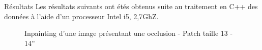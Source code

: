 \documentclass[final,hyperref={pdfpagelabels=false}]{beamer}
\begin{document}
\begin{frame}[t]
\begin{columns}[t]
\begin{column}{.465\textwidth}
\begin{block}{\Large Résultats}
Les résultats suivants ont étés obtenus suite au traitement en C++ des données à l'aide d'un processeur Intel i5, 2,7GhZ.
\begin{figure}[H]
\centering
{}
\caption{Inpainting d'une image présentant une occlusion  - Patch taille 13 - 14''}
\end{figure}


\end{block}
\end{column}
\end{columns}
\end{frame}
\end{document}

